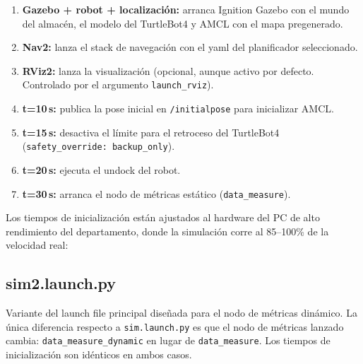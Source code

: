 \begin{enumerate}
    \item \textbf{Gazebo + robot + localización:} arranca Ignition Gazebo con el mundo del almacén, el modelo del TurtleBot4 y AMCL con el mapa pregenerado.
    \item \textbf{Nav2:} lanza el stack de navegación con el yaml del planificador seleccionado.
    \item \textbf{RViz2:} lanza la visualización (opcional, aunque activo por defecto. Controlado por el argumento \texttt{launch\_rviz}).
    \item \textbf{t=10\,s:} publica la pose inicial en \texttt{/initialpose} para inicializar AMCL.
    \item \textbf{t=15\,s:} desactiva el límite para el retroceso del TurtleBot4 (\texttt{safety\_override: backup\_only}).
    \item \textbf{t=20\,s:} ejecuta el undock del robot.
    \item \textbf{t=30\,s:} arranca el nodo de métricas estático (\texttt{data\_measure}).
\end{enumerate}

Los tiempos de inicialización están ajustados al hardware del PC de alto rendimiento del departamento, donde la simulación corre al 85--100\% de la velocidad real:

\subsection{sim2.launch.py}

Variante del launch file principal diseñada para el nodo de métricas dinámico. La única diferencia respecto a \texttt{sim.launch.py} es que el nodo de métricas lanzado cambia: \texttt{data\_measure\_dynamic} en lugar de \texttt{data\_measure}. Los tiempos de inicialización son idénticos en ambos casos.

